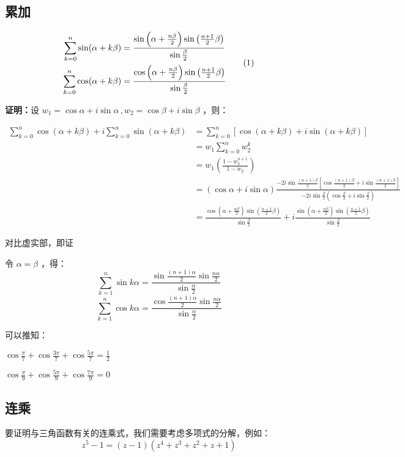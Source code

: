 \subsection{累加}
\begin{theorem}{}

$$\begin{aligned}
\sum_{k=0}^n\sin(\alpha+k\beta)&=\frac{\sin\left(\alpha+\frac{n\beta}2\right)\sin\left(\frac{n+1}2\beta\right)}{\sin\frac{\beta}2}\\\sum_{k=0}^n\cos(\alpha+k\beta)&=\frac{\cos\left(\alpha+\frac{n\beta}2\right)\sin\left(\frac{n+1}2\beta\right)}{\sin\frac{\beta}2}
\end{aligned}\\\tag{1}$$

\textbf{证明：}设 $w_1=\cos \alpha+i\sin\alpha\,,w_2=\cos \beta+i\sin\beta$ ，则：

$$\begin{aligned}
\sum_{k=0}^n\cos(\alpha+k\beta)+i\sum_{k=0}^n\sin(\alpha+k\beta)&=\sum_{k=0}^n\left[\cos(\alpha+k\beta)+i\sin(\alpha+k\beta)\right]\\&=w_1\sum_{k=0}^nw_2^k \\&=w_1\left(\frac{1-w_2^{n+1}}{1-w_2}\right)\\ &=(\cos \alpha+i\sin\alpha)\frac{-2i\sin{\frac{(n+1)\beta}2}\left[\cos{\frac{(n+1)\beta}2}+i\sin{\frac{(n+1)\beta}2}\right]}{-2i\sin{\frac{\beta}2}\left(\cos{\frac{\beta}2}+i\sin{\frac{\beta}2}\right)}\\ &=\frac{\cos\left(\alpha+\frac{n\beta}2\right)\sin\left(\frac{n+1}2\beta\right)}{\sin\frac{\beta}2}+i\frac{\sin\left(\alpha+\frac{n\beta}2\right)\sin\left(\frac{n+1}2\beta\right)}{\sin\frac{\beta}2}
\end{aligned}$$

对比虚实部，即证
\end{theorem}

令 $\alpha=\beta$ ，得：
$$\sum_{k=1}^n\sin k\alpha=\frac{\sin{\frac{(n+1)\alpha}2}\sin{\frac{n\alpha}{2}}}{\sin{\frac{\alpha}2}}$$ $$\sum_{k=1}^n\cos k\alpha=\frac{\cos{\frac{(n+1)\alpha}2}\sin{\frac{n\alpha}{2}}}{\sin{\frac{\alpha}2}}$$ 

可以推知：

$\displaystyle{\cos\frac{\pi}{7}+\cos\frac{3\pi}{7}+\cos\frac{5\pi}{7}=\frac{1}{2}}$

$\displaystyle{\cos\frac{\pi}{9}+\cos\frac{5\pi}{9}+\cos\frac{7\pi}{9}=0}$

\subsection{连乘}
要证明与三角函数有关的连乘式，我们需要考虑多项式的分解，例如：
$$z^5-1=(z-1)(z^4+z^3+z^2+z+1)$$

